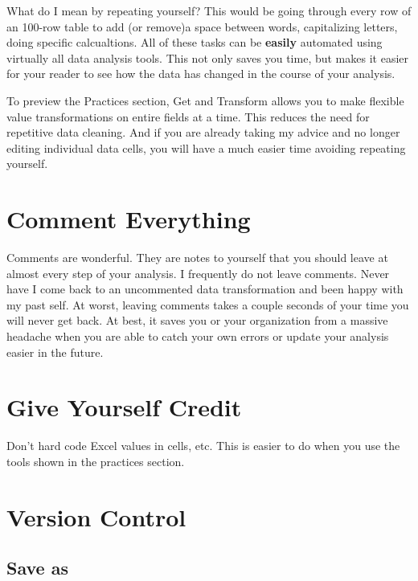 \documentclass[]{book}
\begin{document}
What do I mean by repeating yourself? This would be going through every row of an 100-row table to add (or remove)a space between words, capitalizing letters, doing specific calcualtions. All of these tasks can be \textbf{easily} automated using virtually all data analysis tools. This not only saves you time, but makes it easier for your reader to see how the data has changed in the course of your analysis.

To preview the Practices section, Get and Transform allows you to make flexible value transformations on entire fields at a time. This reduces the need for repetitive data cleaning. And if you are already taking my advice and no longer editing individual data cells, you will have a much easier time avoiding repeating yourself.

\hypertarget{comment-everything}{%
\section{Comment Everything}\label{comment-everything}}

Comments are wonderful. They are notes to yourself that you should leave at almost every step of your analysis. I frequently do not leave comments. Never have I come back to an uncommented data transformation and been happy with my past self. At worst, leaving comments takes a couple seconds of your time you will never get back. At best, it saves you or your organization from a massive headache when you are able to catch your own errors or update your analysis easier in the future.

\hypertarget{give-yourself-credit}{%
\section{Give Yourself Credit}\label{give-yourself-credit}}

Don't hard code Excel values in cells, etc. This is easier to do when you use the tools shown in the practices section.

\hypertarget{version-control}{%
\section{Version Control}\label{version-control}}

\hypertarget{save-as}{%
\subsection{Save as}\label{save-as}}
\end{document}
